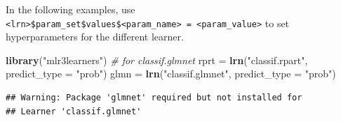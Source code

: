 \documentclass[]{article}
\newenvironment{Shaded}{\begin{snugshade}}{\end{snugshade}}
\newcommand{\CommentTok}[1]{\textcolor[rgb]{0.56,0.35,0.01}{\textit{#1}}}
\newcommand{\DataTypeTok}[1]{\textcolor[rgb]{0.13,0.29,0.53}{#1}}
\newcommand{\KeywordTok}[1]{\textcolor[rgb]{0.13,0.29,0.53}{\textbf{#1}}}
\newcommand{\NormalTok}[1]{#1}
\newcommand{\StringTok}[1]{\textcolor[rgb]{0.31,0.60,0.02}{#1}}
\renewenvironment{Shaded} {\begin{snugshade}\small} {\end{snugshade}}
\begin{document}
In the following examples, use \texttt{\textless{}lrn\textgreater{}\$param\_set\$values\$\textless{}param\_name\textgreater{}\ =\ \textless{}param\_value\textgreater{}} to set hyperparameters
for the different learner.

\begin{Shaded}
\begin{Highlighting}[]
\KeywordTok{library}\NormalTok{(}\StringTok{"mlr3learners"}\NormalTok{) }\CommentTok{# for classif.glmnet}
\NormalTok{rprt =}\StringTok{ }\KeywordTok{lrn}\NormalTok{(}\StringTok{"classif.rpart"}\NormalTok{, }\DataTypeTok{predict_type =} \StringTok{"prob"}\NormalTok{)}
\NormalTok{glmn =}\StringTok{ }\KeywordTok{lrn}\NormalTok{(}\StringTok{"classif.glmnet"}\NormalTok{, }\DataTypeTok{predict_type =} \StringTok{"prob"}\NormalTok{)}
\end{Highlighting}
\end{Shaded}

\begin{verbatim}
## Warning: Package 'glmnet' required but not installed for
## Learner 'classif.glmnet'
\end{verbatim}
\end{document}
